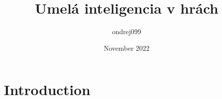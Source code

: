 \documentclass{article}
\title{Umelá inteligencia v hrách}
\author{ondrej099 }
\date{November 2022}
\begin{document}
\maketitle

\section{Introduction}
\end{document}
